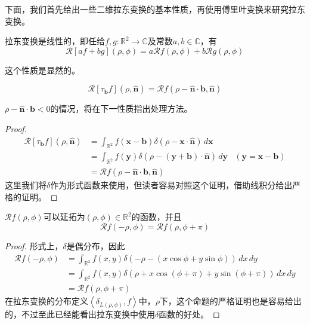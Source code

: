 下面，我们首先给出一些二维拉东变换的基本性质，再使用傅里叶变换来研究拉东变换。

\begin{proposition}[线性性]
    拉东变换是线性的，即任给$f,g:\mathbb{R}^2\to\mathbb{C}$及常数$a,b\in\mathbb{C}$，有
    \[\mathcal{R}[af+bg](\rho,\phi)=a\mathcal{R} f(\rho,\phi)+b\mathcal{R} g(\rho,\phi)\]
\end{proposition}
这个性质是显然的。

\begin{proposition}[平移性质]
    \[\mathcal{R} [\tau_{\mathbf{b}}f](\rho,\hat{\mathbf{n}})=\mathcal{R} f(\rho-\hat{\mathbf{n}}\cdot\mathbf{b},\hat{\mathbf{n}})\]
\end{proposition}
$\rho-\hat{\mathbf{n}}\cdot\mathbf{b}<0$的情况，将在下一性质指出处理方法。
\begin{proof}
    \begin{align*}
        \mathcal{R} [\tau_{\mathbf{b}}f](\rho,\hat{\mathbf{n}})&=\int_{\mathbb{R}^2}f(\mathbf{x}-\mathbf{b})\delta(\rho-\mathbf{x}\cdot\hat{\mathbf{n}})\,d\mathbf{x}\\
        &=\int_{\mathbb{R}^2}f(\mathbf{y})\delta(\rho-(\mathbf{y}+\mathbf{b})\cdot\hat{\mathbf{n}})\,d\mathbf{y}&(\mathbf{y}=\mathbf{x}-\mathbf{b})\\
        &=\mathcal{R} f(\rho-\hat{\mathbf{n}}\cdot\mathbf{b},\hat{\mathbf{n}}) 
    \end{align*}
    这里我们将$\delta$作为形式函数来使用，但读者容易对照这个证明，借助线积分给出严格的证明。
\end{proof}

\begin{proposition}[均匀性]
    $\mathcal{R} f(\rho,\phi)$可以延拓为$(\rho,\phi)\in\mathbb{R}^2$的函数，并且
    \[\mathcal{R} f(-\rho,\phi)=\mathcal{R} f(\rho,\phi+\pi)\]
\end{proposition}
\begin{proof}
    形式上，$\delta$是偶分布，因此
    \begin{align*}
        \mathcal{R} f(-\rho,\phi)&=\int_{\mathbb{R}^2}f(x,y)\delta(-\rho - (x\cos\phi+y\sin\phi))\,dx\,dy\\
        &=\int_{\mathbb{R}^2}f(x,y)\delta(\rho + x\cos(\phi+\pi)+y\sin(\phi+\pi))\,dx\,dy\\
        &=\mathcal{R} f(\rho,\phi+\pi)
    \end{align*}
    在拉东变换的分布定义$\left\langle \delta_{L(\rho,\phi)},f\right\rangle$中，$\rho$下，这个命题的严格证明也是容易给出的，不过至此已经能看出拉东变换中使用$\delta$函数的好处。
\end{proof}

